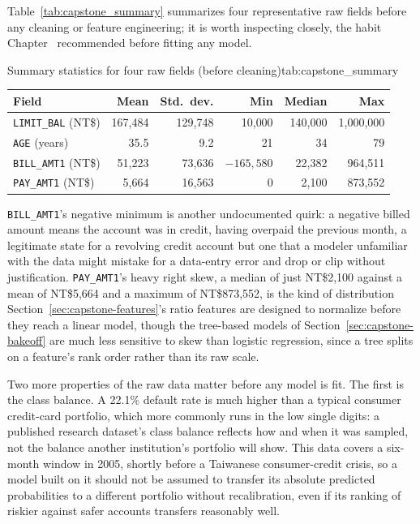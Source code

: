 \documentclass[../ai_in_finance]{subfiles}
\begin{document}
Table~\ref{tab:capstone_summary} summarizes four representative raw fields before any cleaning or feature engineering; it is worth inspecting closely, the habit Chapter~ recommended before fitting any model.

\begin{booktable}[htbp]{Summary statistics for four raw fields (before cleaning)}{tab:capstone_summary}
\begin{tabular}{lrrrrr}
\toprule
Field & Mean & Std.\ dev. & Min & Median & Max \\
\midrule
\texttt{LIMIT\_BAL} (NT\$) & 167{,}484 & 129{,}748 & 10{,}000 & 140{,}000 & 1{,}000{,}000 \\
\texttt{AGE} (years) & 35.5 & 9.2 & 21 & 34 & 79 \\
\texttt{BILL\_AMT1} (NT\$) & 51{,}223 & 73{,}636 & $-165{,}580$ & 22{,}382 & 964{,}511 \\
\texttt{PAY\_AMT1} (NT\$) & 5{,}664 & 16{,}563 & 0 & 2{,}100 & 873{,}552 \\
\bottomrule
\end{tabular}
\end{booktable}

\texttt{BILL\_AMT1}'s negative minimum is another undocumented quirk: a negative billed amount means the account was in credit, having overpaid the previous month, a legitimate state for a revolving credit account but one that a modeler unfamiliar with the data might mistake for a data-entry error and drop or clip without justification. \texttt{PAY\_AMT1}'s heavy right skew, a median of just NT\$2,100 against a mean of NT\$5,664 and a maximum of NT\$873,552, is the kind of distribution Section~\ref{sec:capstone-features}'s ratio features are designed to normalize before they reach a linear model, though the tree-based models of Section~\ref{sec:capstone-bakeoff} are much less sensitive to skew than logistic regression, since a tree splits on a feature's rank order rather than its raw scale.

Two more properties of the raw data matter before any model is fit. The first is the class balance. A 22.1\% default rate is much higher than a typical consumer credit-card portfolio, which more commonly runs in the low single digits: a published research dataset's class balance reflects how and when it was sampled, not the balance another institution's portfolio will show. This data covers a six-month window in 2005, shortly before a Taiwanese consumer-credit crisis, so a model built on it should not be assumed to transfer its absolute predicted probabilities to a different portfolio without recalibration, even if its ranking of riskier against safer accounts transfers reasonably well.
\end{document}
